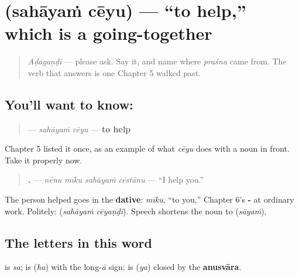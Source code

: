 \section[\texorpdfstring{\te{సహాయం} \te{చేయు} (sahāyaṁ cēyu)}{సహాయం చేయు (sahāyaṁ cēyu)}]{  (sahāyaṁ cēyu) — \textquotedblleft{}to help,\textquotedblright{} which is a going-together}

\label{lesson:TE-C34-sahayam-ceyu}



\begin{quote}
\emph{Aḍagaṇḍi} — please ask. Say it, and name where \emph{praśna} came from. The verb that answers is one Chapter 5 walked past.
\end{quote}

\subsection*{You'll want to know:  }
\begin{quote}
\textbf{ } — \emph{sahāyaṁ cēyu} — \textbf{to help}
\end{quote}

Chapter 5 listed it once, as an example of what \emph{cēyu} does with a noun in front. Take it properly now.

\begin{quote}
\textbf{   .} — \emph{nēnu mīku sahāyaṁ cēstānu} — \textquotedblleft{}I help you.\textquotedblright{}
\end{quote}

The person helped goes in the \textbf{dative}: \emph{mīku}, \textquotedblleft{}to you,\textquotedblright{} Chapter 6's \textbf{-} at ordinary work. Politely: \textbf{ } (\emph{sahāyaṁ cēyaṇḍi}). Speech shortens the noun to \textbf{} (\emph{sāyaṁ}).

\subsection*{The letters in this word}
\textbf{} is \emph{sa}; \textbf{} is \textbf{} (\emph{ha}) with the long-\emph{ā} sign; \textbf{} is \textbf{} (\emph{ya}) closed by the \textbf{anusvāra}.

